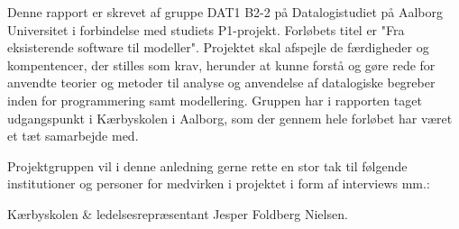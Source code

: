 Denne rapport er skrevet af gruppe DAT1 B2-2 på Datalogistudiet på Aalborg Universitet i forbindelse med studiets P1-projekt. Forløbets titel er "Fra eksisterende software til modeller". Projektet skal afspejle de færdigheder og kompentencer, der stilles som krav, herunder at kunne forstå og gøre rede for anvendte teorier og metoder til analyse og anvendelse af datalogiske begreber inden for programmering samt modellering. Gruppen har i rapporten taget udgangspunkt i Kærbyskolen i Aalborg, som der gennem hele forløbet har været et tæt samarbejde med.

Projektgruppen vil i denne anledning gerne rette en stor tak til følgende institutioner og personer for medvirken i projektet i form af interviews mm.:

Kærbyskolen \& ledelsesrepræsentant Jesper Foldberg Nielsen.